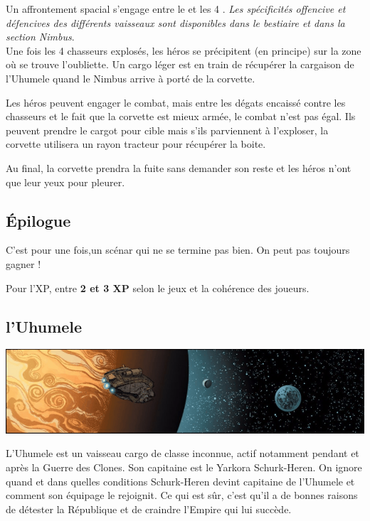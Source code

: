 Un affrontement spacial s’engage entre le  et les 4 . \textit{Les spécificités offencive et défencives des différents vaisseaux sont disponibles dans le bestiaire et dans la section Nimbus}.\\

Une fois les 4 chasseurs explosés, les héros se précipitent (en principe) sur la zone où se trouve l’oubliette. Un cargo léger est en train de récupérer la cargaison de l’Uhumele quand le Nimbus arrive à porté de la corvette.

Les héros peuvent engager le combat, mais entre les dégats encaissé contre les chasseurs et le fait que la corvette est mieux armée, le combat n’est pas égal. Ils peuvent prendre le cargot pour cible mais s’ils parviennent à l’exploser, la corvette utilisera un rayon tracteur pour récupérer la boite.

Au final, la corvette prendra la fuite sans demander son reste et les héros n’ont que leur yeux pour pleurer.

\subsection{\'Epilogue}
C’est pour une fois,un scénar qui ne se termine pas bien. On peut pas toujours gagner !

Pour l’XP, entre \textbf{2 et 3 XP} selon le jeux et la cohérence des joueurs.

\clearpage
\subsection{l’Uhumele}\label{sec:uhumele}
\noindent\includegraphics[width=\textwidth]{_img/songes-de-l-uhumele/uhumele-pano.png}

L'Uhumele est un vaisseau cargo de classe inconnue, actif notamment pendant et après la Guerre des Clones. Son capitaine est le Yarkora Schurk-Heren. On ignore quand et dans quelles conditions Schurk-Heren devint capitaine de l’Uhumele et comment son équipage le rejoignit. Ce qui est sûr, c'est qu’il a de bonnes raisons de détester la République et de craindre l’Empire qui lui succède.

